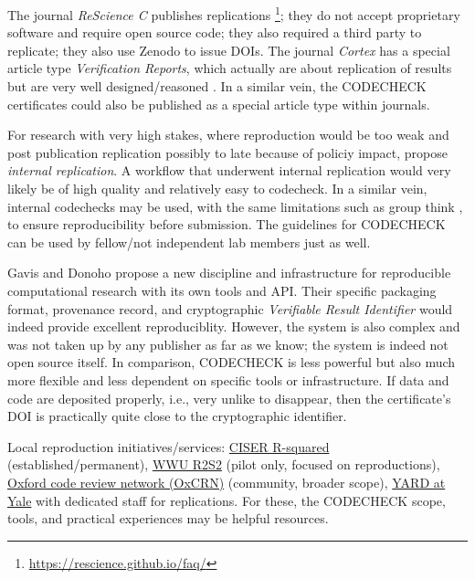 \documentclass[12pt]{article}
\begin{document}
The journal \emph{ReScience C} publishes replications
\footnote{\url{https://rescience.github.io/faq/}};
they do not accept proprietary software and require open source code;
they also required a third party to replicate; they also use Zenodo
to issue DOIs.
The journal \emph{Cortex} has a special article type 
\emph{Verification Reports}, which  actually are about replication of results 
but are very well designed/reasoned \cite{chambers_verification_2020}.
In a similar vein, the CODECHECK certificates
could also be published as a special article type within journals.

For research with very high stakes, where reproduction would be too weak and
post publication replication possibly to late because of policiy impact,
\cite{benjamin-chung_internal_2020} propose \emph{internal replication}.
A workflow that underwent internal
replication would very likely be of high quality and relatively easy to codecheck.
In a similar vein, internal codechecks may be used, with the same limitations such
as group think \cite{benjamin-chung_internal_2020},
to ensure reproducibility before submission. The guidelines
for CODECHECK can be used by fellow/not independent lab members just as well.

Gavis and Donoho \cite{gavish_universal_2011} propose a new discipline and 
infrastructure for reproducible computational research with its own tools and
API. Their specific packaging format, provenance record, and cryptographic
\emph{Verifiable Result Identifier} would indeed provide excellent
reproduciblity. However, the system is also complex and was not taken up by
any publisher as far as we know; the system is indeed not open source itself.
In comparison, CODECHECK is less powerful but also much more flexible and
less dependent on specific tools or infrastructure. If data and code are 
deposited properly, i.e., very unlike to disappear, then the certificate's 
DOI is practically quite close to the cryptographic identifier.

Local reproduction initiatives/services:
\href{https://ciser.cornell.edu/research/results-reproduction-r-squared-service/}{CISER R-squared}
(established/permanent),
\href{https://go.wwu.de/r2s2}{WWU R2S2} (pilot only, focused on reproductions),
\href{https://github.com/OxfordCodeReviewNet/forum}{Oxford code review network (OxCRN)}
(community, broader scope), \href{https://isps.yale.edu/research/data/approach}{YARD 
at Yale} with dedicated staff for replications.
For these, the CODECHECK scope, tools, and practical experiences may be
helpful resources.
\end{document}
